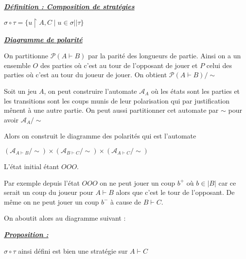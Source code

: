 \documentclass[a4paper,12ptCOUCOU
]{article}
\newlength{\mydepth}
\newlength{\myheight}
\newenvironment{answer}
{\par\begin{lrbox}{\mybox}\quad\begin{minipage}{\linewidth}\color{black}\setlength{\parskip}{10pt plus 1pt minus 1pt}\vspace*{-.7\baselineskip}}
{\end{minipage}\end{lrbox}
\settodepth{\mydepth}{\usebox{\mybox}}
\settoheight{\myheight}{\usebox{\mybox}}
\addtolength{\myheight}{\mydepth}
\noindent\makebox[0pt]{
  \color{gray}\hspace{-0pt}\rule[-\mydepth]{1pt}{\myheight}}
\usebox{\mybox}
  }
\begin{document}
\begin{samepage}\textbf{\textit{\underline{ Définition : Composition de stratégies }}} \begin{answer}
$\sigma \circ \tau = \{u \upharpoonright A,C \mid u \in \sigma || \tau\}$
\end{answer}\end{samepage}

\begin{samepage}\textbf{\textit{\underline{ Diagramme de polarité }}} \begin{answer}
On partitionne $\mathcal{P}(A \vdash B)$ par la parité des longueurs de
partie.
Ainsi on a un ensemble $O$ des parties où c'est au tour de l'opposant
de jouer et $P$ celui des parties où c'est au tour du joueur de jouer.
On obtient $\mathcal{P}(A \vdash B) / \sim$

Soit un jeu $A$, on peut construire l'automate $\mathcal{A}_A$ où les états
sont les parties et les transitions sont les coups munis de leur polarisation
qui par justification mênent à une autre partie.
On peut aussi partitionner cet automate par $\sim$ pour avoir $\mathcal{A}_A/\sim$

Alors on construit le diagramme des polarités qui est l'automate

$(\mathcal{A}_{A \vdash B}/\sim) \times (\mathcal{A}_{B \vdash C}/\sim) \times (\mathcal{A}_{A \vdash C}/\sim)$

L'état initial étant $OOO$.

Par exemple depuis l'état $OOO$ on ne peut jouer un coup $b^+$ où $b \in |B|$
car ce serait un coup du joueur pour $A \vdash B$ alors que c'est le tour de
l'opposant.
De même on ne peut jouer un coup $b^-$ à cause de $B \vdash C$.

On aboutit alors au diagramme suivant :


\end{answer}\end{samepage}

\begin{samepage}\textbf{\textit{\underline{ Proposition : }}} \begin{answer}
$\sigma \circ \tau$ ainsi défini est bien une stratégie sur $A \vdash C$
\end{answer}\end{samepage}
\end{document}
